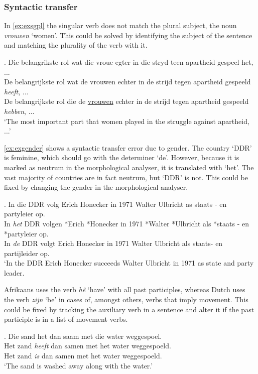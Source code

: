 \documentclass[11pt]{article}
\begin{document}
\subsubsection{Syntactic transfer}

In \ref{ex:exsgpl} the singular verb does not match the plural subject, the noun {\em vrouwen} `women'. This 
could be solved by identifying the subject of the sentence and matching the plurality 
of the verb with it.

\ex. \label{ex:exsgpl} 
    Die belangrikste rol wat die vroue egter in die stryd teen apartheid gespeel het, ... \\
    De belangrijkste rol wat de vrouwen echter in de strijd tegen apartheid gespeeld {\em heeft}, ... \\
    De belangrijkste rol die de \underline{vrouwen} echter in de strijd tegen apartheid gespeeld {\em hebben}, ... \\
    `The most important part that women played in the struggle against apartheid, ...' 

\ref{ex:exgender} shows a syntactic transfer error due to gender. The country `DDR' is feminine, which
should go with the determiner `de'. However, because it is marked as neutrum in the morphological analyser,
it is translated with `het'. The vast majority of countries are in fact neutrum, but `DDR' is not. This could
be fixed by changing the gender in the morphological analyser.

\ex. \label{ex:exgender}
    In die DDR volg Erich Honecker in 1971 Walter Ulbricht as staats - en partyleier op. \\
    In {\em het} DDR volgen *Erich *Honecker in 1971 *Walter *Ulbricht als *staats - en *partyleier op. \\
    In {\em de} DDR volgt Erich Honecker in 1971 Walter Ulbricht als staats- en partijleider op. \\
    `In the DDR Erich Honecker succeeds Walter Ulbricht in 1971 as state and party leader.

Afrikaans uses the verb {\em hê} `have' with all past participles, whereas Dutch uses the 
verb {\em zijn} `be' in cases of, amongst others, verbs that imply movement. This could be fixed 
by tracking the auxiliary verb in a sentence and alter it if the past participle is in a list
of movement verbs.

\ex. \label{ex:exserhaverl} 
    Die sand het dan saam met die water weggespoel. \\
    Het zand {\em heeft} dan samen met het water weggespoeld. \\
    Het zand {\em is} dan samen met het water weggespoeld. \\
   `The sand is washed away along with the water.'
\end{document}
